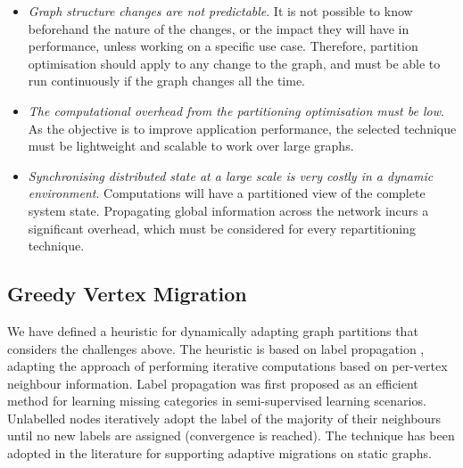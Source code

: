 \documentclass{sig-alternate-10pt}
\begin{document}
\begin{itemize}

\item \emph{Graph structure changes are not predictable}. It is not possible to know beforehand the nature of the changes, or the impact they will have in performance, unless working on a specific use case. Therefore, partition optimisation should apply to any change to the graph, and must be able to run continuously if the graph changes all the time.
\item \emph{The computational overhead from the partitioning optimisation must be low}. As the objective is to improve application performance, the selected technique must be lightweight and scalable to work over large graphs.
\item \emph{Synchronising distributed state at a large scale is very costly in a dynamic environment}. Computations will have a partitioned view of the complete system state. Propagating global information across the network incurs a significant overhead, which must be considered for every repartitioning technique. 

\end{itemize}

\subsection{Greedy Vertex Migration}
\label{subsec:greedy}


We have defined a heuristic for dynamically adapting graph partitions that considers the challenges above. The heuristic is based on label propagation \cite{raghavan2007}, adapting the approach of performing iterative computations based on per-vertex neighbour information. Label propagation was first proposed as an efficient method for learning missing categories in semi-supervised learning scenarios. Unlabelled nodes iteratively adopt the label of the majority of their neighbours until no new labels are assigned (convergence is reached). The technique has been adopted in the literature for supporting adaptive migrations on static graphs\cite{Ugander}. 
\end{document}
